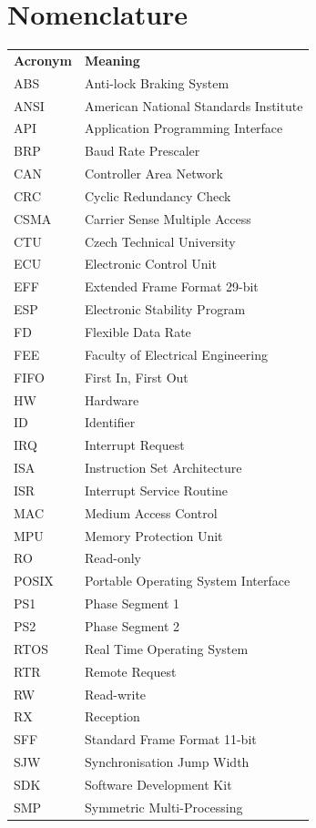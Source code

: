 \documentclass{ctuthesis}
\begin{document}
\maketitle
\chapter*{Nomenclature}

\noindent
\begin{tabularx}{\linewidth}
  { l >{\raggedright\arraybackslash}X }
\bfseries Acronym  & \bfseries Meaning \\\Midrule
ABS & Anti-lock Braking System \\
ANSI & American National Standards Institute \\
API & Application Programming Interface \\
BRP & Baud Rate Prescaler \\
CAN & Controller Area Network \\
CRC & Cyclic Redundancy Check \\
CSMA & Carrier Sense Multiple Access \\
CTU & Czech Technical University \\
ECU & Electronic Control Unit \\
EFF & Extended Frame Format 29-bit \\
ESP & Electronic Stability Program \\
FD & Flexible Data Rate \\
FEE & Faculty of Electrical Engineering \\
FIFO & First In, First Out \\
HW & Hardware \\
ID & Identifier \\
IRQ & Interrupt Request \\
ISA & Instruction Set Architecture \\
ISR & Interrupt Service Routine \\
MAC & Medium Access Control  \\
MPU & Memory Protection Unit \\
RO & Read-only \\
POSIX & Portable Operating System Interface \\
PS1 & Phase Segment 1 \\
PS2 & Phase Segment 2 \\
RTOS & Real Time Operating System \\
RTR & Remote Request \\
RW & Read-write \\
RX & Reception \\
SFF & Standard Frame Format 11-bit \\
SJW & Synchronisation Jump Width \\
SDK & Software Development Kit \\
SMP & Symmetric Multi-Processing \\

\end{tabularx}
\end{document}
